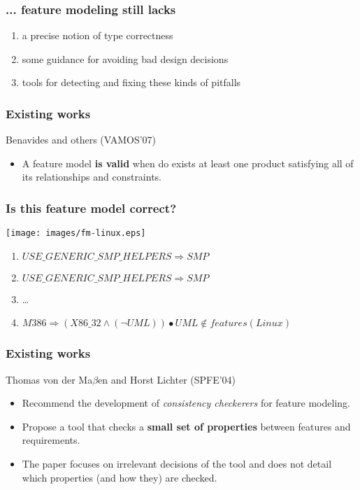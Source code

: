 \documentclass{beamer}
\begin{document}
\begin{frame}

\frametitle{... feature modeling still lacks}

\begin{enumerate}
\item a precise notion of type correctness
\item some guidance for avoiding bad design decisions
\item tools for detecting and fixing these kinds of pitfalls 
\end{enumerate}

\end{frame}

\begin{frame}

\frametitle{Existing works}

Benavides and others (VAMOS'07)
\begin{itemize}
\item A feature model {\bf is valid} when do exists at least one product satisfying all 
of its relationships and constraints.  
\end{itemize}

\end{frame}

\begin{frame}

\frametitle{Is this feature model correct?}

\begin{center}
  \texttt{[image: images/fm-linux.eps]} 
\end{center}
\begin{small}
\begin{enumerate}
\item $USE\_GENERIC\_SMP\_HELPERS \Rightarrow SMP$
\item $USE\_GENERIC\_SMP\_HELPERS \Rightarrow SMP$
\item \ldots
\item $M386 \Rightarrow (X86\_32 \land (\lnot UML)) \bullet UML \notin features (Linux) $
\end{enumerate}
\end{small}
\end{frame}

\begin{frame}

\frametitle{Existing works}

Thomas von der Ma$\beta$en and Horst Lichter (SPFE'04)

\begin{itemize}
\item Recommend the development of \emph{consistency checkerers} for feature modeling.   
\item Propose a tool that checks a {\bf small set of properties} between features and requirements.
\item The paper focuses on irrelevant decisions of the tool and does not detail which properties (and how they) are checked.
\end{itemize}

\end{frame}
\end{document}
